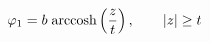 \begin{equation}
  \label{eq:sol_zgt}
  \varphi_1= b \; \hbox{arccosh}\left(\frac{z}{t}\right), \qquad{|z|
  \geq t}
\end{equation}

